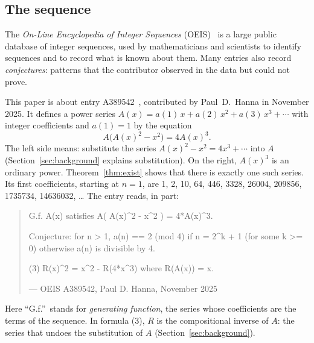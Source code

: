 \documentclass[11pt,a4paper]{article}
\theoremstyle{definition}
\theoremstyle{remark}
\begin{document}
\subsection{The sequence}\label{sec:sequence}
The \emph{On-Line Encyclopedia of Integer Sequences} (OEIS)~\cite{oeisdb} is a large public database of integer
sequences, used by mathematicians and scientists to identify sequences and to record what is known about them. Many
entries also record \emph{conjectures}: patterns that the contributor observed in the data but could not prove.

This paper is about entry A389542~\cite{oeis}, contributed by Paul~D.~Hanna in November 2025. It defines a power
series $A(x)=a(1)\,x+a(2)\,x^2+a(3)\,x^3+\cdots$ with integer coefficients and $a(1)=1$ by the equation
\begin{equation}\label{eq:oeis}
A\bigl(A(x)^2-x^2\bigr)=4A(x)^3 .
\end{equation}
The left side means: substitute the series $A(x)^2-x^2=4x^3+\cdots$ into $A$ (Section~\ref{sec:background} explains
substitution). On the right, $A(x)^3$ is an ordinary power. Theorem~\ref{thm:exist} shows that there is exactly one such
series. Its first coefficients, starting at $n=1$, are 1, 2, 10, 64, 446, 3328, 26004, 209856, 1735734, 14636032, \dots{} The entry reads,
in part:
\begin{quote}\small\ttfamily\raggedright G.f. A(x) satisfies A( A(x)\^{}2 - x\^{}2 ) = 4*A(x)\^{}3.\par\smallskip Conjecture: for n > 1, a(n) == 2 (mod 4) if n = 2\^{}k + 1 (for some k >= 0) otherwise a(n) is divisible by 4.\par\smallskip (3) R(x)\^{}2 = x\^{}2 - R(4*x\^{}3) where R(A(x)) = x.\par\smallskip\hfill\textrm{--- OEIS A389542, Paul D. Hanna, November 2025}\end{quote}

Here ``G.f.''\ stands for \emph{generating function}, the series whose coefficients are the terms of the sequence. In
formula (3), $R$ is the compositional inverse of $A$: the series that undoes the substitution of $A$
(Section~\ref{sec:background}).
\end{document}
